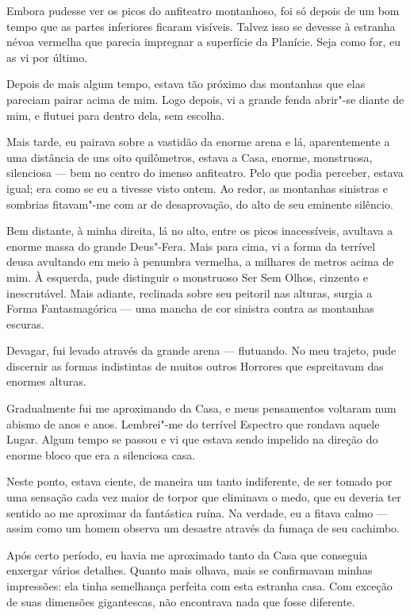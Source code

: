 Embora pudesse ver os picos do anfiteatro montanhoso, foi só depois de um bom tempo que as partes inferiores ficaram
visíveis. Talvez isso se devesse à estranha névoa vermelha que parecia impregnar a superfície da Planície. Seja como
for, eu as vi por último.

Depois de mais algum tempo, estava tão próximo das montanhas que elas pareciam pairar acima de mim. Logo
depois, vi a grande fenda abrir"-se diante de mim, e flutuei para dentro dela, sem escolha.

Mais tarde, eu pairava sobre a vastidão da enorme arena e lá, aparentemente a uma distância de uns oito quilômetros,
estava a Casa, enorme, monstruosa, silenciosa --- bem no centro do imenso anfiteatro. Pelo que podia perceber, estava
igual; era como se eu a tivesse visto ontem. Ao redor, as montanhas sinistras e sombrias fitavam"-me com ar
de desaprovação, do alto de seu eminente silêncio.

Bem distante, à minha direita, lá no alto, entre os picos inacessíveis, avultava a enorme massa do grande Deus"-Fera.
Mais para cima, vi a forma da terrível deusa avultando em meio à penumbra vermelha, a milhares de metros acima de mim.
À esquerda, pude distinguir o monstruoso Ser Sem Olhos, cinzento e inescrutável. Mais adiante, reclinada sobre seu
peitoril nas alturas, surgia a Forma Fantasmagórica --- uma mancha de cor sinistra contra as montanhas escuras.

Devagar, fui levado através da grande arena --- flutuando. No meu trajeto, pude discernir as formas indistintas de
muitos outros Horrores que espreitavam das enormes alturas.

Gradualmente fui me aproximando da Casa, e meus pensamentos voltaram num abismo de anos e anos. Lembrei"-me do terrível
Espectro que rondava aquele Lugar. Algum tempo se passou e vi que estava sendo impelido na direção do enorme bloco que
era a silenciosa casa.

Neste ponto, estava ciente, de maneira um tanto indiferente, de ser tomado por uma sensação cada vez maior de torpor
que eliminava o medo, que eu deveria ter sentido ao me aproximar da fantástica ruína. Na verdade, eu a fitava
calmo --- assim como um homem observa um desastre através da fumaça de seu cachimbo.

Após certo período, eu havia me aproximado tanto da Casa que conseguia enxergar vários detalhes. Quanto mais olhava,
mais se confirmavam minhas impressões: ela tinha semelhança perfeita com esta estranha casa. Com exceção de suas
dimensões gigantescas, não encontrava nada que fosse diferente.

